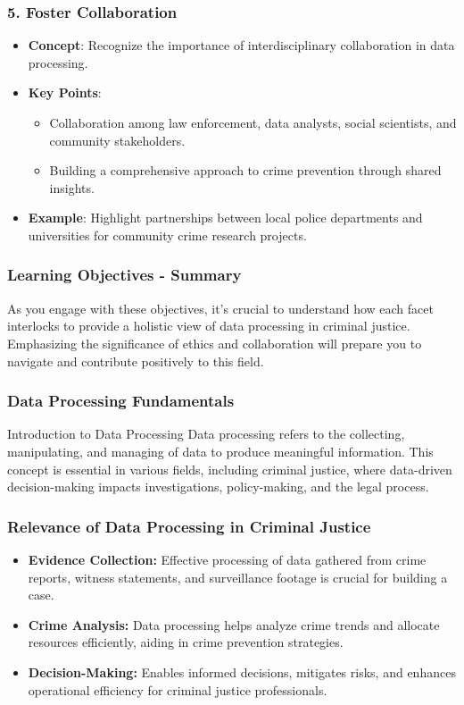 \documentclass[aspectratio=169]{beamer}
\begin{document}
\begin{frame}[fragile]
    \frametitle{5. Foster Collaboration}
    \begin{itemize}
        \item \textbf{Concept}: Recognize the importance of interdisciplinary collaboration in data processing.
        \item \textbf{Key Points}:
        \begin{itemize}
            \item Collaboration among law enforcement, data analysts, social scientists, and community stakeholders.
            \item Building a comprehensive approach to crime prevention through shared insights.
        \end{itemize}
        \item \textbf{Example}: Highlight partnerships between local police departments and universities for community crime research projects.
    \end{itemize}
\end{frame}

\begin{frame}[fragile]
    \frametitle{Learning Objectives - Summary}
    As you engage with these objectives, it's crucial to understand how each facet interlocks to provide a holistic view of data processing in criminal justice. 
    Emphasizing the significance of ethics and collaboration will prepare you to navigate and contribute positively to this field.
\end{frame}

\begin{frame}[fragile]
    \frametitle{Data Processing Fundamentals}
    \begin{block}{Introduction to Data Processing}
        Data processing refers to the collecting, manipulating, and managing of data to produce meaningful information.
        This concept is essential in various fields, including criminal justice, where data-driven decision-making impacts investigations, policy-making, and the legal process.
    \end{block}
\end{frame}

\begin{frame}[fragile]
    \frametitle{Relevance of Data Processing in Criminal Justice}
    \begin{itemize}
        \item \textbf{Evidence Collection:}
        Effective processing of data gathered from crime reports, witness statements, and surveillance footage is crucial for building a case.
        
        \item \textbf{Crime Analysis:}
        Data processing helps analyze crime trends and allocate resources efficiently, aiding in crime prevention strategies.

        \item \textbf{Decision-Making:}
        Enables informed decisions, mitigates risks, and enhances operational efficiency for criminal justice professionals.
    \end{itemize}
\end{frame}
\end{document}
